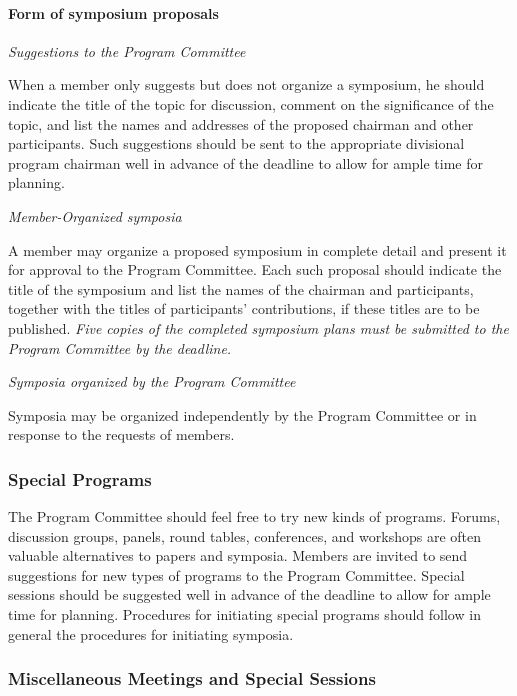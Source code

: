 {{\paragraph{Form of symposium proposals}
\label{formofsymposiumproposals}

\emph{Suggestions to the Program Committee}

When a member only suggests but does not organize a symposium, he should indicate the title of the topic for discussion, comment on the significance of the topic, and list the names and addresses of the proposed chairman and other participants. Such suggestions should be sent to the appropriate divisional program chairman well in advance of the deadline to allow for ample time for planning.

\emph{Member-Organized symposia}

A member may organize a proposed symposium in complete detail and present it for approval to the Program Committee. Each such proposal should indicate the title of the symposium and list the names of the chairman and participants, together with the titles of participants' contributions, if these titles are to be published. \emph{Five copies of the completed symposium plans must be submitted to the Program Committee by the deadline.}

\emph{Symposia organized by the Program Committee}

Symposia may be organized independently by the Program Committee or in response to the requests of members.

\subsubsection{Special Programs}
\label{specialprograms}

The Program Committee should feel free to try new kinds of programs. Forums, discussion groups, panels, round tables, conferences, and workshops are often valuable alternatives to papers and symposia. Members are invited to send suggestions for new types of programs to the Program Committee. Special sessions should be suggested well in advance of the deadline to allow for ample time for planning. Procedures for initiating special programs should follow in general the procedures for initiating symposia.

\subsubsection{Miscellaneous Meetings and Special Sessions}
\label{miscellaneousmeetingsandspecialsessions}

}}
